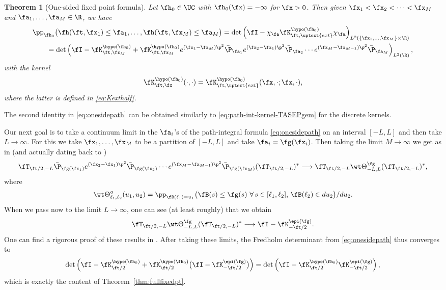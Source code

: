\documentclass[]{pcmi}
\theoremstyle{plain}
\newtheorem{theorem}[equation]{Theorem}
\theoremstyle{definition}
\begin{document}
\begin{theorem}[One-sided fixed point formula]\label{thm:Kfixedpthalf}
Let $\fh_0\in \UC$ with  $\fh_0(\fx) = -\infty$ for $\fx>0$.
	Then given $\fx_1<\fx_2<\dotsm<\fx_M$ and $\fa_1,\ldots,\fa_M\in\R$, we have
	\begin{align}
		&\pp_{\fh_0} \bigl(\fh(\ft,\fx_1)\leq \fa_1,\ldots,\fh(\ft,\fx_M)\leq \fa_M\bigr) =\det \left(\fI-\chi_{\fa} \fK^{\hypo(\fh_0)}_{\ft,\uptext{ext}}\chi_{\fa}\right)_{L^2(\{\fx_1,\ldots,\fx_M\}\times\R)}\\
    		&\hspace{0.275in}=\det \left(\fI-\fK^{\hypo(\fh_0)}_{\ft,\fx_M}+\fK^{\hypo(\fh_0)}_{\ft,\fx_M}e^{(\fx_1-\fx_M)\p^2}\bar \P_{\fa_1}e^{(\fx_2-\fx_1)\p^2}\bar \P_{\fa_2}\dotsm e^{(\fx_M-\fx_{M-1})\p^2}\bar \P_{\fa_M}\right)_{L^2(\R)},\label{eq:onesidepath}
	\end{align}
	with the kernel
	\begin{equation}
	    \fK^{\hypo(\fh_0)}_{\ft,\fx}(\cdot,\cdot) = \fK^{\hypo(\fh_0)}_{\ft,\uptext{ext}}(\fx,\cdot;\fx,\cdot),
	\end{equation}
	where the latter is defined in \eqref{eq:Kexthalf}.
\end{theorem}

\noindent The second identity in \eqref{eq:onesidepath} can be obtained similarly to \eqref{eq:path-int-kernel-TASEPgem} for the discrete kernels.

Our next goal is to take a continuum limit in the $\fa_i$'s of the path-integral formula \eqref{eq:onesidepath} on an interval $[-L,L]$ and then take $L\to\infty$. For this we take $\fx_1,\dotsc,\fx_M$ to be a partition of $[-L,L]$ and take $\fa_i=\fg(\fx_i)$. Then taking the limit $M \to \infty$ we get as in \cite{flat} (and actually dating back to \cite{cqr})
\begin{equation}
\fT_{\ft/2,-L}\bar\P_{\fg(\fx_1)}e^{(\fx_2-\fx_1)\p^2}\bar\P_{\fg(\fx_2)}\dotsm e^{(\fx_M-\fx_{M-1})\p^2}\bar\P_{\fg(\fx_M)}(\fT_{\ft/2,-L})^*
\longrightarrow\fT_{\ft/2,-L}\wt\Theta^{\fg}_{-L,L}(\fT_{\ft/2,-L})^*,\label{eq:continuumLimit}
\end{equation}
where 
\[
\wt\Theta^g_{\ell_1,\ell_2}(u_1,u_2)=\pp_{\fB(\ell_1)=u_1}\big(\fB(s)\leq\fg(s)~\forall\,s\in[\ell_1,\ell_2],\,\fB(\ell_2)\in du_2\big)/du_2.
\]
When we pass now to the limit $L \to \infty$, one can see (at least roughly) that we obtain 
\[
\fT_{\ft/2,-L}\wt\Theta^{\fg}_{-L,L}(\fT_{\ft/2,-L})^*\longrightarrow \fI-\fK^{\epi(\fg)}_{-\ft/2}.
\]
One can find a rigorous proof of these results in \cite{KPZ}. After taking these limits, the Fredholm determinant from \eqref{eq:onesidepath} thus converges to
\begin{equation}
\det\left(\fI-\fK^{\hypo(\fh_0)}_{\ft/2}+\fK^{\hypo(\fh_0)}_{\ft/2} \bigl(\fI-\fK^{\epi(\fg)}_{-\ft/2}\bigr)\right)
=\det\left(\fI-\fK^{\hypo(\fh_0)}_{\ft/2}\fK^{\epi(\fg)}_{-\ft/2}\right),
\end{equation}
which is exactly the content of Theorem~\ref{thm:fullfixedpt}. 
\end{document}
